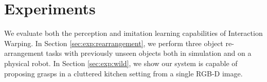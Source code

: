 \documentclass{article}
\begin{document}




\section{Experiments}
\label{sec:exp}

We evaluate both the perception and imitation learning capabilities of Interaction Warping. In Section \ref{sec:exp:rearrangement}, we perform three object re-arrangement tasks with previously unseen objects both in simulation and on a physical robot. In Section \ref{sec:exp:wild}, we show our system is capable of proposing grasps in a cluttered kitchen setting from a single RGB-D image.
\end{document}
